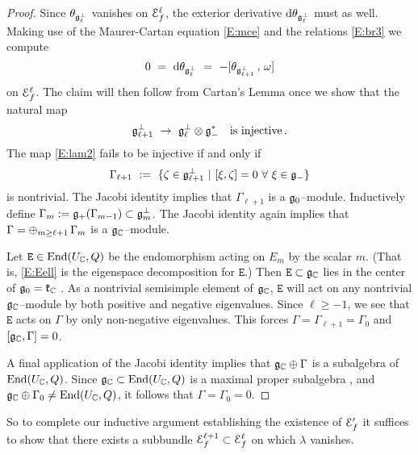 \documentclass[12pt]{amsart}
\numberwithin{equation}{section}
\numberwithin{table}{section}
\numberwithin{figure}{section}
\begin{document}
\begin{proof}
Since $\theta_{{\mathfrak{g}}^\perp_\ell}$ vanishes on $\mathcal E^\ell_f$, the exterior derivative $\mathrm{d} \theta_{{\mathfrak{g}}^\perp_\ell}$ must as well.  Making use of the Maurer-Cartan equation \eqref{E:mce} and the relations \eqref{E:br3} we compute 
\begin{equation} \label{E:dth}
  0 \ = \ \mathrm{d} \theta_{{\mathfrak{g}}^\perp_\ell} \ = \  
  - [ \theta_{{\mathfrak{g}}^\perp_{\ell+1}} \,,\, \omega ]
\end{equation}
on $\mathcal E_f^\ell$.  The claim will then follow from Cartan's Lemma \cite[Lemma A.1.9]{MR2003610} once we show that the natural map
\begin{equation}\label{E:lam2}
  {\mathfrak{g}}^\perp_{\ell+1} \ \to \ {\mathfrak{g}}^\perp_\ell \otimes {\mathfrak{g}}_-^*
  \quad\hbox{is injective} \,.
\end{equation}
The map \eqref{E:lam2} fails to be injective if and only if 
\[
  \Gamma_{\ell+1} \ := \ 
  \{ \z \in \fg^\perp_{\ell+1} \ | \ [\xi,\z]=0 \ \forall \ \xi \in \fg_- \}
\]
is nontrivial.  The Jacobi identity implies that $\Gamma_{\ell+1}$ is a ${\mathfrak{g}}_0$--module.  Inductively define $\Gamma_m := {\mathfrak{g}}_+(\Gamma_{m-1}) \subset {\mathfrak{g}}^\perp_m$.  The Jacobi identity again implies that $\Gamma = \oplus_{m\ge\ell+1}\,\Gamma_m$ is a ${\mathfrak{g}}_\mathbb C$--module.  

Let $\mathtt{E} \in \mathrm{End}(U_\mathbb C,Q)$ be the endomorphism acting on $E_m$ by the scalar $m$. (That is, \eqref{E:Eell} is the eigenspace decomposition for $\mathtt{E}$.)  Then $\mathtt{E} \subset {\mathfrak{g}}_\mathbb C$ lies in the center of ${\mathfrak{g}}_0 = \mathfrak{k}_\mathbb C$ \cite[Proposition 3.1.2]{MR2532439}.  As a nontrivial semisimple element of ${\mathfrak{g}}_\mathbb C$, $\mathtt{E}$ will act on any nontrivial ${\mathfrak{g}}_\mathbb C$--module by both positive and negative eigenvalues.  Since $\ell \ge -1$, we see that $\mathtt{E}$ acts on $\Gamma$ by only non-negative eigenvalues.  This forces $\Gamma = \Gamma_{\ell+1} = \Gamma_0$ and $[{\mathfrak{g}}_\mathbb C,\Gamma] = 0$.  

A final application of the Jacobi identity implies that ${\mathfrak{g}}_\mathbb C \oplus \Gamma$ is a subalgebra of $\mathrm{End}(U_\mathbb C,Q)$.  Since ${\mathfrak{g}}_\mathbb C \subset \mathrm{End}(U_\mathbb C,Q)$ is a maximal proper subalgebra \cite[Theorem 1.5]{MR0049903_trans}, and ${\mathfrak{g}}_\mathbb C \oplus \Gamma_0 \not= \mathrm{End}(U_\mathbb C,Q)$, it follows that $\Gamma = \Gamma_0 = 0$.
\end{proof}

\noindent So to complete our inductive argument establishing the existence of $\mathcal E_f'$ it suffices to show that there exists a subbundle $\mathcal E^{\ell+1}_f \subset \mathcal E^\ell_f$ on which $\lambda$ vanishes.  
\end{document}
